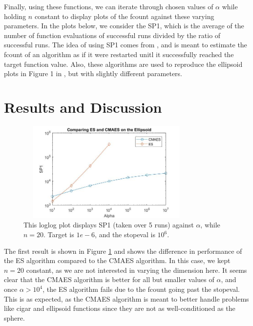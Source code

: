 \documentclass[sigconf, 6pt]{acmart}
\begin{document}
Finally, using these functions, we can iterate through chosen values of $\alpha$ while holding $n$ constant to display plots of the fcount against these varying parameters. In the plots below, we consider the SP1, which is the average of the number of function evaluations of successful runs divided by the ratio of successful runs. The idea of using SP1 comes from \cite{derivativefree}, and is meant to estimate the fcount of an algorithm as if it were restarted unitl it successfully reached the target function value. Also, these algorithms are used to reproduce the ellipsoid plots in Figure 1 in \cite{derivativefree}, but with slightly different parameters. 



\section{Results and Discussion}
\label{result}


\begin{figure}[h]
\centering
  \includegraphics[height = 5cm, width=9cm]{A3ESstrategies.jpg}
  \caption{This loglog plot displays SP1 (taken over 5 runs) against $\alpha$, while $n=20$. Target is $1e-6$, and the stopeval is $10^6$.}
  \label{fig:ES}
\end{figure}

The first result is shown in Figure \ref{fig:ES} and shows the difference in performance of the ES algorithm compared to the CMAES algorithm. In this case, we kept $n=20$ constant, as we are not interested in varying the dimension here. It seems clear that the CMAES algorithm is better for all but smaller values of $\alpha$, and once $\alpha>10^4$, the ES algorithm fails due to the fcount going past the stopeval. This is as expected, as the CMAES algorithm is meant to better handle problems like cigar and ellipsoid functions since they are not as well-conditioned as the sphere.
\end{document}
